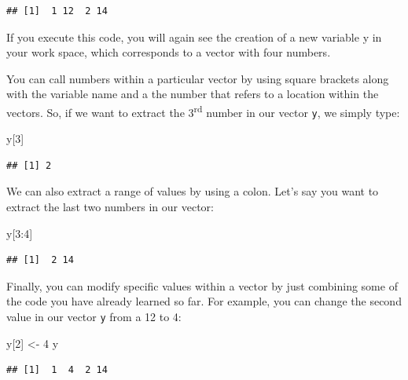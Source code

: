 \documentclass[
]{book}
\newenvironment{Shaded}{\begin{snugshade}}{\end{snugshade}}
\newcommand{\DecValTok}[1]{\textcolor[rgb]{0.00,0.00,0.81}{#1}}
\newcommand{\NormalTok}[1]{#1}
\newcommand{\OtherTok}[1]{\textcolor[rgb]{0.56,0.35,0.01}{#1}}
\newcommand{\SpecialCharTok}[1]{\textcolor[rgb]{0.00,0.00,0.00}{#1}}
\begin{document}
\begin{verbatim}
## [1]  1 12  2 14
\end{verbatim}

If you execute this code, you will again see the creation of a new variable y in your work space, which corresponds to a vector with four numbers.

You can call numbers within a particular vector by using square brackets along with the variable name and a the number that refers to a location within the vectors. So, if we want to extract the 3\textsuperscript{rd} number in our vector \texttt{y}, we simply type:

\begin{Shaded}
\begin{Highlighting}[]
\NormalTok{y[}\DecValTok{3}\NormalTok{]}
\end{Highlighting}
\end{Shaded}

\begin{verbatim}
## [1] 2
\end{verbatim}

We can also extract a range of values by using a colon. Let's say you want to extract the last two numbers in our vector:

\begin{Shaded}
\begin{Highlighting}[]
\NormalTok{y[}\DecValTok{3}\SpecialCharTok{:}\DecValTok{4}\NormalTok{]}
\end{Highlighting}
\end{Shaded}

\begin{verbatim}
## [1]  2 14
\end{verbatim}

Finally, you can modify specific values within a vector by just combining some of the code you have already learned so far. For example, you can change the second value in our vector \texttt{y} from a 12 to 4:

\begin{Shaded}
\begin{Highlighting}[]
\NormalTok{y[}\DecValTok{2}\NormalTok{] }\OtherTok{\textless{}{-}} \DecValTok{4}
\NormalTok{y}
\end{Highlighting}
\end{Shaded}

\begin{verbatim}
## [1]  1  4  2 14
\end{verbatim}
\end{document}
